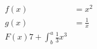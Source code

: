 \documentclass{article}
\begin{document}
	\begin{align*}
		f(x) &= x^2\\
		g(x) &= \frac{1}{x}\\
		F(x) 7+ \int^a_b
		\frac{1}{3}x^3
	\end{align*}
\end{document}
